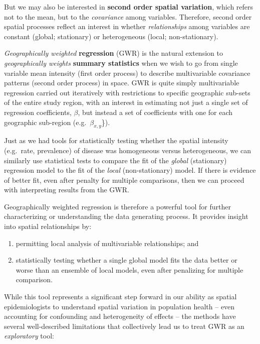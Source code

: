 \documentclass[
]{book}
\providecommand{\tightlist}{%
  \setlength{\itemsep}{0pt}\setlength{\parskip}{0pt}}
\begin{document}
But we may also be interested in \textbf{second order spatial variation}, which refers not to the mean, but to the \emph{covariance} among variables. Therefore, second order spatial processes reflect an interest in whether \emph{relationships} among variables are constant (global; stationary) or heterogeneous (local; non-stationary).

\emph{Geographically weighted} \textbf{regression} (GWR) is the natural extension to \emph{geographically weights} \textbf{summary statistics} when we wish to go from single variable mean intensity (first order process) to describe multivariable covariance patterns (second order process) in space. GWR is quite simply multivariable regression carried out iteratively with restrictions to specific geographic sub-sets of the entire study region, with an interest in estimating not just a single set of regression coefficients, \(\beta\), but instead a set of coefficients with one for each geographic sub-region (e.g.~\(\beta_{x,y}\)\}).

Just as we had tools for statistically testing whether the spatial intensity (e.g.~rate, prevalence) of disease was homogeneous versus heterogeneous, we can similarly use statistical tests to compare the fit of the \emph{global} (stationary) regression model to the fit of the \emph{local} (non-stationary) model. If there is evidence of better fit, even after penalty for multiple comparisons, then we can proceed with interpreting results from the GWR.

Geographically weighted regression is therefore a powerful tool for further characterizing or understanding the data generating process. It provides insight into spatial relationships by:

\begin{enumerate}
\def\labelenumi{\alph{enumi})}
\tightlist
\item
  permitting local analysis of multivariable relationships; and
\item
  statistically testing whether a single global model fits the data better or worse than an ensemble of local models, even after penalizing for multiple comparison.
\end{enumerate}

While this tool represents a significant step forward in our ability as spatial epidemiologists to understand spatial variation in population health -- even accounting for confounding and heterogeneity of effects -- the methods have several well-described limitations that collectively lead us to treat GWR as an \emph{exploratory} tool:
\end{document}
